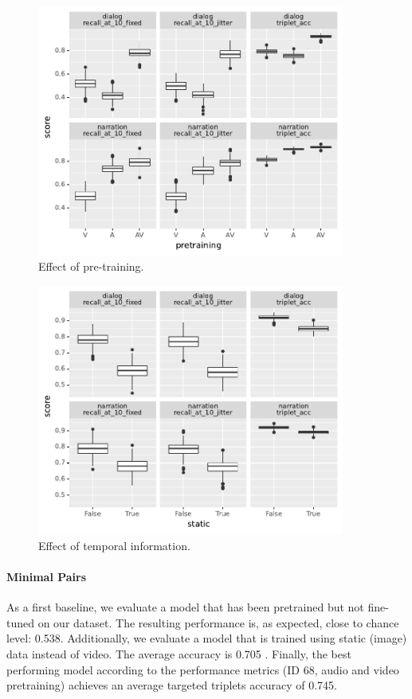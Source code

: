 \begin{figure}[htb]
  \centering
  \includegraphics[width=0.9\textwidth]{results/ablations/pretraining.pdf}
  \caption{Effect of pre-training.}
  \label{fig:pretraining}
\end{figure}

\begin{figure}[htb]
  \centering
  \includegraphics[width=0.9\textwidth]{results/ablations/static.pdf}
  \caption{Effect of temporal information.}
  \label{fig:static}
\end{figure}


\paragraph{Minimal Pairs}
As a first baseline, we evaluate a model that has been pretrained but not fine-tuned on our dataset. The resulting performance is, as expected, close to chance level: 0.538. Additionally, we evaluate a model that is trained using static (image) data instead of video. The average accuracy is 0.705 . Finally, the best performing model according to the
performance metrics (ID 68, audio and video pretraining) achieves an average
targeted triplets accuracy of 0.745.

